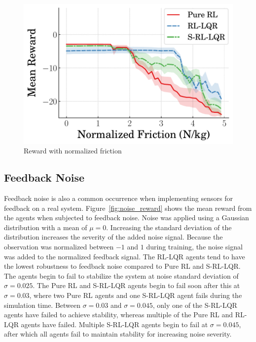 \begin{figure}[t]
    \centering
    \includegraphics[scale=0.65]{figures/figures_robustness/invpend_robustness/friction_reward}
    \caption{Reward with normalized friction}
    \label{fig:friction_reward}
\end{figure}

\subsection{Feedback Noise}

Feedback noise is also a common occurrence when implementing sensors for feedback on a real system. Figure~\ref{fig:noise_reward} shows the mean reward from the agents when subjected to feedback noise. Noise was applied using a Gaussian distribution with a mean of $\mu=0$. Increasing the standard deviation of the distribution increases the severity of the added noise signal. Because the observation was normalized between $-1$ and $1$ during training, the noise signal was added to the normalized feedback signal.
%
The RL-LQR agents tend to have the lowest robustness to feedback noise compared to Pure RL and S-RL-LQR. The agents begin to fail to stabilize the system at noise standard deviation of $\sigma=0.025$. The Pure RL and S-RL-LQR agents begin to fail soon after this at $\sigma=0.03$, where two Pure RL agents and one S-RL-LQR agent fails during the simulation time. Between $\sigma=0.03$ and $\sigma=0.045$, only one of the S-RL-LQR agents have failed to achieve stability, whereas multiple of the Pure RL and RL-LQR agents have failed. Multiple S-RL-LQR agents begin to fail at $\sigma=0.045$, after which all agents fail to maintain stability for increasing noise severity.


